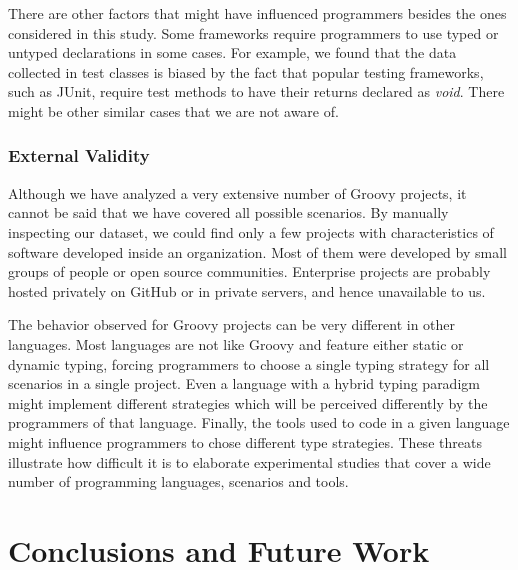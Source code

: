 \documentclass[msc]{ppgccufmg}
\begin{document}
There are other factors that might have influenced programmers besides the ones considered in this study.
Some frameworks require programmers to use typed or untyped declarations in some cases.
For example, we found that the data collected in test classes is biased by the fact that popular testing frameworks, such as JUnit, require test methods to have their returns declared as \emph{void}.
There might be other similar cases that we are not aware of.

\subsection*{External Validity}
Although we have analyzed a very extensive number of Groovy projects, it cannot be said that we have covered all possible scenarios.
By manually inspecting our dataset, we could find only a few projects with characteristics of software developed inside an organization.
Most of them were developed by small groups of people or open source communities.
Enterprise projects are probably hosted privately on GitHub or in private servers, and hence unavailable to us.

The behavior observed for Groovy projects can be very different in other languages.
Most languages are not like Groovy and feature either static or dynamic typing, forcing programmers to choose a single typing strategy for all scenarios in a single project.
Even a language with a hybrid typing paradigm might implement different strategies which will be perceived differently by the programmers of that language.
Finally, the tools used to code in a given language might influence programmers to chose different type strategies.
These threats illustrate how difficult it is to elaborate experimental studies that cover a wide number of programming languages, scenarios and tools.









%
%
\chapter{Conclusions and Future Work\label{conclusion}}
\end{document}

